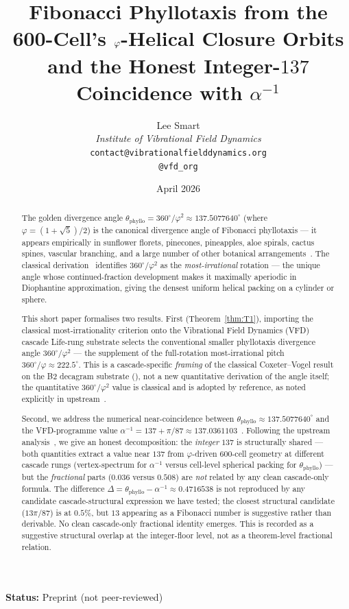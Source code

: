 \documentclass[12pt]{article}
\title{Fibonacci Phyllotaxis from the 600-Cell's $\phig$-Helical Closure Orbits\\[6pt]
\large and the Honest Integer-$137$ Coincidence with $\alpha^{-1}$}
\author{%
  Lee Smart\\[4pt]
  \textit{Institute of Vibrational Field Dynamics}\\[2pt]
  \texttt{contact@vibrationalfielddynamics.org}\\[2pt]
  \texttt{@vfd\_org}%
}
\date{April 2026}
\newcommand{\phig}{\varphi}
\begin{document}
\maketitle

\noindent\textbf{Status:} Preprint (not peer-reviewed)

\begin{abstract}
The golden divergence angle $\theta_{\mathrm{phyllo}} = 360^{\circ}/\phig^2
\approx 137.5077640^{\circ}$ (where $\phig = (1+\sqrt{5})/2$) is the
canonical divergence angle of Fibonacci phyllotaxis --- it appears
empirically in sunflower florets, pinecones, pineapples, aloe spirals,
cactus spines, vascular branching, and a large number of other
botanical arrangements~\cite{Jean1994,AdlerBarabe,Vogel1979}. The
classical derivation~\cite{Coxeter1953,Vogel1979} identifies
$360^{\circ}/\phig^2$ as the \emph{most-irrational} rotation --- the
unique angle whose continued-fraction development makes it maximally
aperiodic in Diophantine approximation, giving the densest uniform
helical packing on a cylinder or sphere.

This short paper formalises two results. First (Theorem~\ref{thm:T1}),
importing the classical most-irrationality criterion onto the
Vibrational Field Dynamics (VFD) cascade Life-rung substrate
selects the conventional smaller phyllotaxis divergence angle
$360^{\circ}/\phig^2$ --- the supplement of the full-rotation
most-irrational pitch $360^{\circ}/\phig \approx 222.5^{\circ}$.
This is a cascade-specific \emph{framing} of the classical
Coxeter--Vogel result on the B2 decagram substrate
(\cite[\S5.1]{CascadeBio}), not a new quantitative derivation of
the angle itself; the quantitative $360^{\circ}/\phig^2$ value is
classical and is adopted by reference, as noted explicitly in
upstream~\cite[\S B6]{CascadeBio}.

Second, we address the numerical near-coincidence between
$\theta_{\mathrm{phyllo}} \approx 137.5077640^{\circ}$ and the
VFD-programme value
$\alpha^{-1} = 137 + \pi/87 \approx 137.0361103$~\cite{CascadeAlphaChain,SmartXXII}.
Following the upstream
analysis~\cite[\S B6.1--B6.2]{CascadeBio}, we give an honest
decomposition: the \emph{integer} $137$ is structurally shared ---
both quantities extract a value near $137$ from $\phig$-driven
$600$-cell geometry at different cascade rungs (vertex-spectrum for
$\alpha^{-1}$ versus cell-level spherical packing for
$\theta_{\mathrm{phyllo}}$) --- but the \emph{fractional} parts
($0.036$ versus $0.508$) are \emph{not} related by any clean
cascade-only formula. The difference
$\Delta = \theta_{\mathrm{phyllo}} - \alpha^{-1} \approx 0.4716538$
is not reproduced by any candidate cascade-structural expression
we have tested; the closest structural candidate ($13\pi/87$) is
at $0.5\%$, but $13$ appearing as a Fibonacci number is suggestive
rather than derivable. No clean cascade-only fractional identity
emerges. This is recorded as a suggestive structural overlap at
the integer-floor level, not as a theorem-level fractional
relation.


\end{abstract}
\end{document}

